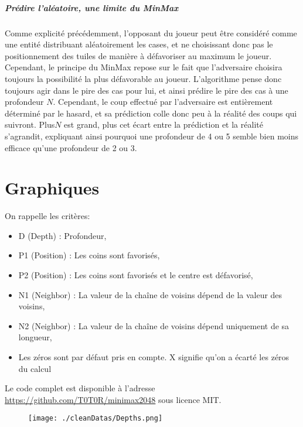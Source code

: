 \documentclass[a4paper]{report}
\begin{document}
\paragraph{Prédire l’aléatoire, une limite du MinMax}
Comme explicité précédemment, l'opposant du joueur peut être considéré comme une entité distribuant aléatoirement les cases, et ne choisissant donc pas le positionnement des tuiles de manière à défavoriser au maximum le joueur. Cependant, le principe du MinMax repose sur le fait que l’adversaire choisira toujours la possibilité la plus défavorable au joueur. L’algorithme pense donc toujours agir dans le pire des cas pour lui, et ainsi prédire le pire des cas à une profondeur $N$. Cependant, le coup effectué par l’adversaire est entièrement déterminé par le hasard, et sa prédiction colle donc peu à la réalité des coups qui suivront. Plus$ N$ est grand, plus cet écart entre la prédiction et la réalité s’agrandit, expliquant ainsi pourquoi une profondeur de 4 ou 5 semble bien moins efficace qu’une profondeur de 2 ou 3.



\appendix
\chapter{Graphiques}
On rappelle les critères:
\begin{itemize}
\item D (Depth) : Profondeur,
\item P1 (Position) : Les coins sont favorisés,
\item P2 (Position) : Les coins sont favorisés et le centre est défavorisé,
\item N1 (Neighbor) : La valeur de la chaîne de voisins dépend de la valeur des voisins,
\item N2 (Neighbor) : La valeur de la chaîne de voisins dépend uniquement de sa longueur,
\item Les zéros sont par défaut pris en compte. X signifie qu'on a écarté les zéros du calcul
\end{itemize}

Le code complet est disponible à l'adresse \url{https://github.com/T0T0R/minimax2048} sous licence MIT.

\newpage
\begin{figure}[h]
\begin{center}
\texttt{[image: ./cleanDatas/Depths.png]}
\end{center}
\end{figure}
\end{document}

